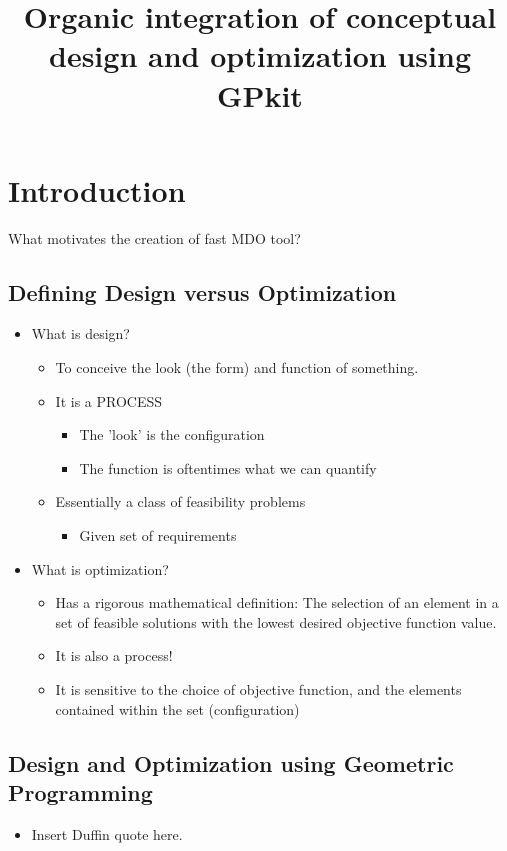 \documentclass{aiaa-pretty}
\begin{document}
\title{Organic integration of conceptual design and optimization using GPkit}
\section{\bf Introduction}
	What motivates the creation of  fast MDO tool? 
	
\subsection{Defining Design versus Optimization}
\begin{itemize}
\item What is design? 
\begin{itemize}
\item To conceive the look (the form) and function of something. 
\item It is a PROCESS
\begin{itemize}
	\item The 'look' is the configuration
	\item The function is oftentimes what we can quantify
\end{itemize}
\item Essentially a class of feasibility problems 
\begin{itemize}
\item Given set of requirements
\end{itemize}
\end{itemize}
\item What is optimization?
\begin{itemize}
\item Has a rigorous mathematical definition: The selection of an element in a set of feasible solutions with the lowest desired objective function value. 
\item It is also a process!
\item It is sensitive to the choice of objective function, and the elements contained within the set (configuration)
\end{itemize}
\end{itemize}
\subsection{Design and Optimization using Geometric Programming}

\begin{itemize}
	\item Insert Duffin quote here. 
\end{itemize}
\end{document}

